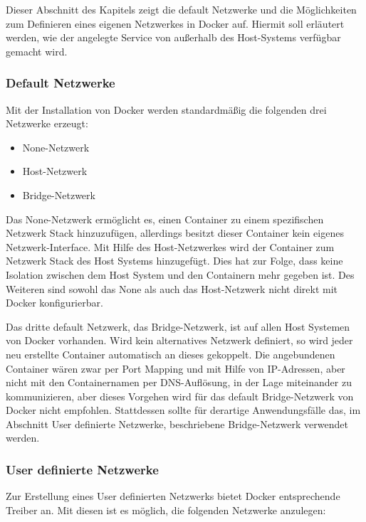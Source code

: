 Dieser Abschnitt des Kapitels zeigt die default Netzwerke und die Möglichkeiten zum Definieren eines eigenen Netzwerkes in Docker auf.
Hiermit soll erläutert werden, wie der angelegte Service von außerhalb des Host-Systems verfügbar gemacht wird.

\subsubsection{Default Netzwerke}

Mit der Installation von Docker werden standardmäßig die folgenden drei Netzwerke erzeugt:

\begin{itemize}
	\item None-Netzwerk
	\item Host-Netzwerk
	\item Bridge-Netzwerk
\end{itemize}

Das None-Netzwerk ermöglicht es, einen Container zu einem spezifischen Netzwerk Stack hinzuzufügen, allerdings besitzt dieser Container kein eigenes Netzwerk-Interface. 
Mit Hilfe des Host-Netzwerkes wird der Container zum Netzwerk Stack des Host Systems hinzugefügt.
Dies hat zur Folge, dass keine Isolation zwischen dem Host System und den Containern mehr gegeben ist.
Des Weiteren sind sowohl das None als auch das Host-Netzwerk nicht direkt mit Docker konfigurierbar.

Das dritte default Netzwerk, das Bridge-Netzwerk, ist auf allen Host Systemen von Docker vorhanden.
Wird kein alternatives Netzwerk definiert, so wird jeder neu erstellte Container automatisch an dieses gekoppelt.
Die angebundenen Container wären zwar per Port Mapping und mit Hilfe von IP-Adressen, aber nicht mit den Containernamen per DNS-Auflösung, in der Lage miteinander zu kommunizieren, aber dieses Vorgehen wird für das default Bridge-Netzwerk von Docker nicht empfohlen.
Stattdessen sollte für derartige Anwendungsfälle das, im Abschnitt User definierte Netzwerke, beschriebene Bridge-Netzwerk verwendet werden.

\subsubsection{User definierte Netzwerke}

Zur Erstellung eines User definierten Netzwerks bietet Docker entsprechende Treiber an.
Mit diesen ist es möglich, die folgenden Netzwerke anzulegen:

